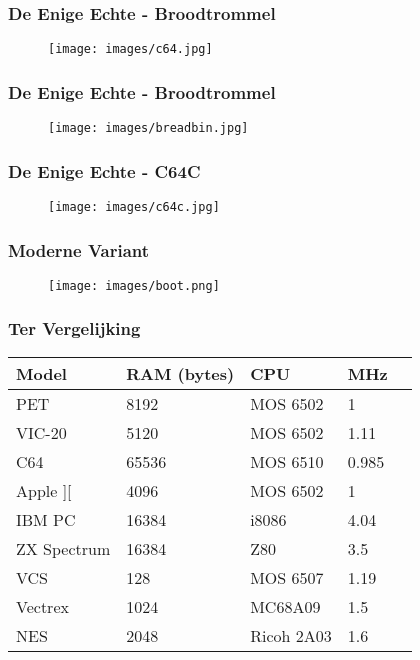 \documentclass[aspectratio=43]{uva-inf-presentation}
\begin{document}
\begin{frame}
\frametitle{De Enige Echte - Broodtrommel}

\begin{figure}
\texttt{[image: images/c64.jpg]}
\end{figure}

\end{frame}


\begin{frame}
\frametitle{De Enige Echte - Broodtrommel}

\begin{figure}
\texttt{[image: images/breadbin.jpg]}
\end{figure}

\end{frame}


\begin{frame}
\frametitle{De Enige Echte - C64C}

\begin{figure}
\texttt{[image: images/c64c.jpg]}
\end{figure}

\end{frame}


\begin{frame}
\frametitle{Moderne Variant}

\begin{figure}
\texttt{[image: images/boot.png]}
\end{figure}

\end{frame}


\begin{frame}
\frametitle{Ter Vergelijking}

\begin{tabular}{|l|l|l|l|l|}
\hline Model & RAM (bytes) & CPU & MHz \\ \hline
PET & 8192 & MOS 6502 & 1 \\
VIC-20 & 5120 & MOS 6502 & 1.11 \\
C64 & 65536 & MOS 6510 & 0.985 \\ \hline
Apple ][ & 4096 & MOS 6502 & 1 \\
IBM PC & 16384 & i8086 & 4.04 \\
ZX Spectrum & 16384 & Z80 & 3.5 \\ \hline
VCS & 128 & MOS 6507 & 1.19 \\
Vectrex & 1024 & MC68A09 & 1.5 \\
NES & 2048 & Ricoh 2A03 & 1.6 \\ \hline
\end{tabular}

\end{frame}
\end{document}
